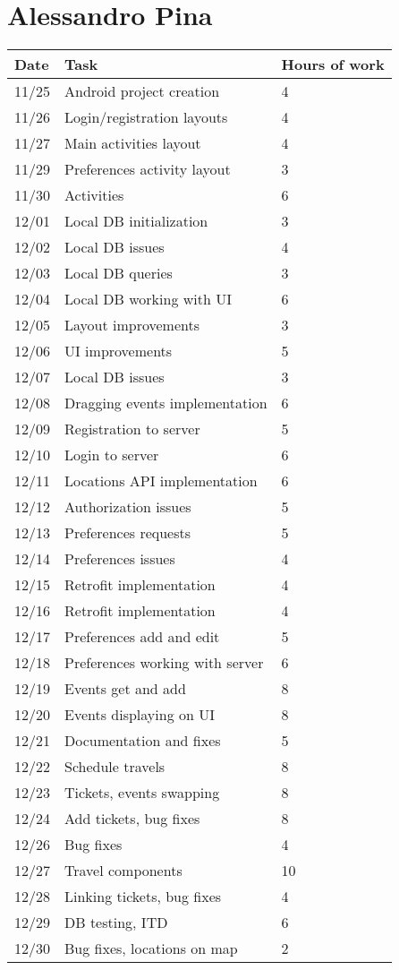 \section{Alessandro Pina}
\begin{longtable}{ p{2cm} p{10cm} p{3cm}}
	Date & Task & Hours of work\\
	\hline
	11/25 & Android project creation & 4 \\
	11/26 & Login/registration layouts & 4 \\
	11/27 & Main activities layout & 4 \\
	11/29 & Preferences activity layout & 3 \\
	11/30 & Activities & 6 \\
	12/01 & Local DB initialization & 3 \\
	12/02 & Local DB issues & 4 \\
	12/03 & Local DB queries & 3 \\
	12/04 & Local DB working with UI & 6 \\
	12/05 & Layout improvements & 3 \\
	12/06 & UI improvements & 5 \\
	12/07 & Local DB issues & 3 \\
	12/08 & Dragging events implementation & 6 \\
	12/09 & Registration to server & 5 \\
	12/10 & Login to server & 6 \\
	12/11 & Locations API implementation & 6 \\
	12/12 & Authorization issues & 5 \\
	12/13 & Preferences requests & 5 \\
	12/14 & Preferences issues & 4 \\
	12/15 & Retrofit implementation & 4 \\
	12/16 & Retrofit implementation & 4 \\
	12/17 & Preferences add and edit & 5 \\
	12/18 & Preferences working with server & 6 \\
	12/19 & Events get and add & 8 \\
	12/20 & Events displaying on UI & 8 \\
	12/21 & Documentation and fixes & 5 \\
	12/22 & Schedule travels & 8 \\
	12/23 & Tickets, events swapping & 8 \\
	12/24 & Add tickets, bug fixes & 8 \\
	12/26 & Bug fixes & 4 \\
	12/27 & Travel components & 10 \\
	12/28 & Linking tickets, bug fixes & 4 \\
	12/29 & DB testing, ITD & 6 \\
	12/30 & Bug fixes, locations on map & 2 \\
\end{longtable}

